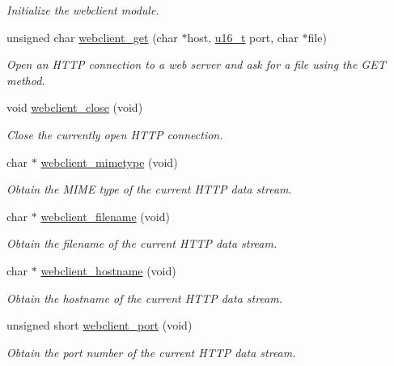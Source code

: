 \begin{CompactItemize}
\begin{CompactList}\small\item\em Initialize the webclient module. \item\end{CompactList}\item 
unsigned char \hyperlink{a00079_gf9385ef9ecc74c7d53ff2f15e62bfde3}{webclient\_\-get} (char $\ast$host, \hyperlink{a00070_gfc6499c1f28697aa3bfc2804d496fd11}{u16\_\-t} port, char $\ast$file)
\begin{CompactList}\small\item\em Open an HTTP connection to a web server and ask for a file using the GET method. \item\end{CompactList}\item 
\hypertarget{a00079_g1d34be506a61db90dd7829117efdf8cf}{
void \hyperlink{a00079_g1d34be506a61db90dd7829117efdf8cf}{webclient\_\-close} (void)}
\label{a00079_g1d34be506a61db90dd7829117efdf8cf}

\begin{CompactList}\small\item\em Close the currently open HTTP connection. \item\end{CompactList}\item 
char $\ast$ \hyperlink{a00079_g4433d3af16ea083a81576d0f18ba57c9}{webclient\_\-mimetype} (void)
\begin{CompactList}\small\item\em Obtain the MIME type of the current HTTP data stream. \item\end{CompactList}\item 
char $\ast$ \hyperlink{a00079_g41e616d3fcc17e0aabfe8ab45ef0d30f}{webclient\_\-filename} (void)
\begin{CompactList}\small\item\em Obtain the filename of the current HTTP data stream. \item\end{CompactList}\item 
char $\ast$ \hyperlink{a00079_g0e0ea5f24b77f124ba33bcbc7ede5bfb}{webclient\_\-hostname} (void)
\begin{CompactList}\small\item\em Obtain the hostname of the current HTTP data stream. \item\end{CompactList}\item 
unsigned short \hyperlink{a00079_g2a939aa4fcffabbce1dc1f784a7e0ad3}{webclient\_\-port} (void)
\begin{CompactList}\small\item\em Obtain the port number of the current HTTP data stream. \item\end{CompactList}\end{CompactItemize}


